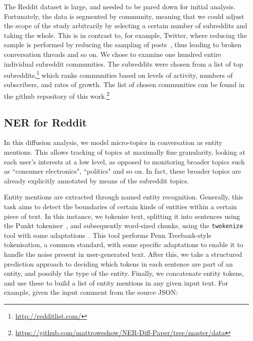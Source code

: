 \documentclass[10pt,journal,compsoc]{IEEEtran}
\begin{document}
The Reddit dataset is large, and needed to be pared down for initial analysis.
Fortunately, the data is segmented by community, meaning that we could adjust the scope of the study arbitrarily by selecting a certain number of subreddits and taking the whole.
This is in contrast to, for example, Twitter, where reducing the sample is performed by reducing the sampling of posts~\cite{kergl2014endogenesis}, thus leading to broken conversation threads and so on.
We chose to examine one hundred entire individual subreddit communities.
The subreddits were chosen from a list of top subreddits,\footnote{\url{http://redditlist.com/}} which ranks communities based on levels of activity, numbers of subscribers, and rates of growth.
The list of chosen communities can be found in the github repository of this work.\footnote{\url{https://github.com/mattroweshow/NER-Diff-Paper/tree/master/data}}


\subsection{NER for Reddit}

In this diffusion analysis, we model micro-topics in conversation as entity mentions.
This allows tracking of topics at maximally fine granularity, looking at each user's interests at a low level, as opposed to monitoring broader topics such as ``consumer electronics", ``politics" and so on.
In fact, these broader topics are already explicitly annotated by means of the subreddit topics.

Entity mentions are extracted through named entity recognition.
Generally, this task aims to detect the boundaries of certain kinds of entities within a certain piece of text.
In this instance, we tokenise text, splitting it into sentences using the Punkt tokeniser~\cite{kiss2006unsupervised}, and subsequently word-sized chunks, using the {\tt twokenize} tool with some adaptations~\cite{o2010tweetmotif}.
This tool performs Penn Treebank-style tokenisation, a common standard, with some specific adaptations to enable it to handle the noise present in user-generated text.
After this, we take a structured prediction approach to deciding which tokens in each sentence are part of an entity, and possibly the type of the entity.
Finally, we concatenate entity tokens, and use these to build a list of entity mentions in any given input text.
For example, given the input comment from the source JSON:
\end{document}
